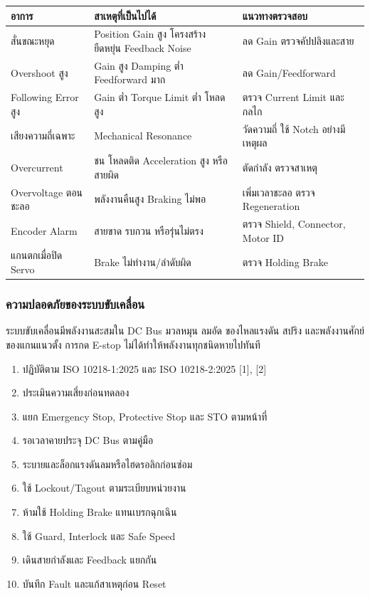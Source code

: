 \begin{table}[htbp]
    \centering
    \begin{tabular}{l l l}
        \hline
        \textbf{อาการ} & \textbf{สาเหตุที่เป็นไปได้} & \textbf{แนวทางตรวจสอบ} \\
        \hline
        สั่นขณะหยุด & Position Gain สูง โครงสร้างยืดหยุ่น Feedback Noise & ลด Gain ตรวจคัปปลิงและสาย \\
        Overshoot สูง & Gain สูง Damping ต่ำ Feedforward มาก & ลด Gain/Feedforward \\
        Following Error สูง & Gain ต่ำ Torque Limit ต่ำ โหลดสูง & ตรวจ Current Limit และกลไก \\
        เสียงความถี่เฉพาะ & Mechanical Resonance & วัดความถี่ ใช้ Notch อย่างมีเหตุผล \\
        Overcurrent & ชน โหลดติด Acceleration สูง หรือสายผิด & ตัดกำลัง ตรวจสาเหตุ \\
        Overvoltage ตอนชะลอ & พลังงานคืนสูง Braking ไม่พอ & เพิ่มเวลาชะลอ ตรวจ Regeneration \\
        Encoder Alarm & สายขาด รบกวน หรือรุ่นไม่ตรง & ตรวจ Shield, Connector, Motor ID \\
        แกนตกเมื่อปิด Servo & Brake ไม่ทำงาน/ลำดับผิด & ตรวจ Holding Brake \\
        \hline
    \end{tabular}
\end{table}

\subsubsection{ความปลอดภัยของระบบขับเคลื่อน}

ระบบขับเคลื่อนมีพลังงานสะสมใน DC Bus มวลหมุน ลมอัด ของไหลแรงดัน สปริง และพลังงานศักย์ของแกนแนวตั้ง การกด E-stop ไม่ได้ทำให้พลังงานทุกชนิดหายไปทันที

\begin{enumerate}
    \item ปฏิบัติตาม ISO 10218-1:2025 และ ISO 10218-2:2025 [1], [2]
    \item ประเมินความเสี่ยงก่อนทดลอง
    \item แยก Emergency Stop, Protective Stop และ STO ตามหน้าที่
    \item รอเวลาคายประจุ DC Bus ตามคู่มือ
    \item ระบายและล็อกแรงดันลมหรือไฮดรอลิกก่อนซ่อม
    \item ใช้ Lockout/Tagout ตามระเบียบหน่วยงาน
    \item ห้ามใช้ Holding Brake แทนเบรกฉุกเฉิน
    \item ใช้ Guard, Interlock และ Safe Speed
    \item เดินสายกำลังและ Feedback แยกกัน
    \item บันทึก Fault และแก้สาเหตุก่อน Reset
\end{enumerate}

